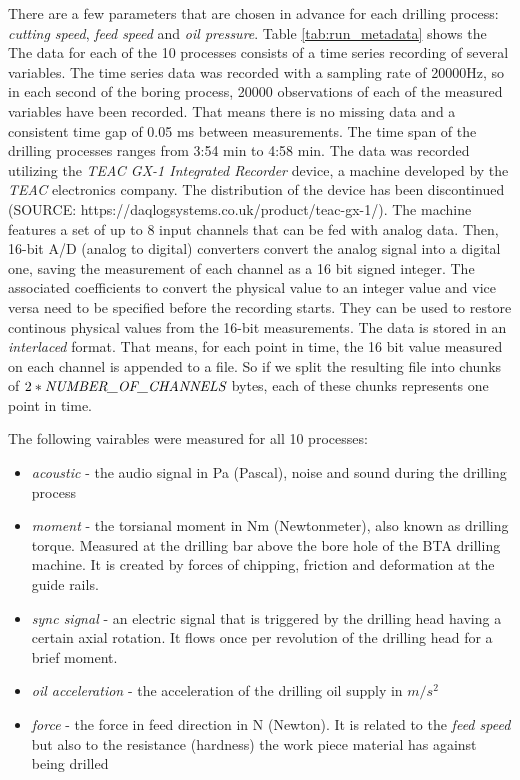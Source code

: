\documentclass[12 pt]{scrartcl}
\begin{document}
There are a few parameters that are chosen in advance for each drilling process: \emph{cutting speed}, \emph{feed speed} and \emph{oil pressure}. Table \ref{tab:run_metadata} shows the
The data for each of the 10 processes consists of a time series recording of several variables.
The time series data was recorded with a sampling rate of 20000Hz, so in each second of the boring process, 20000 observations of each of the measured variables have been recorded. That means there is no missing data and a consistent time gap of 0.05 ms between measurements. The time span of the drilling processes ranges from 3:54 min to 4:58 min.
The data was recorded utilizing the \emph{TEAC GX-1 Integrated Recorder} device, a machine developed by the \emph{TEAC} electronics company. The distribution of the device has been discontinued (SOURCE: https://daqlogsystems.co.uk/product/teac-gx-1/). The machine features a set of up to 8 input channels that can be fed with analog data.
Then, 16-bit A/D (analog to digital) converters convert the analog signal into a digital one, saving the measurement of each channel as a 16 bit signed integer.
The associated coefficients to convert the physical value to an integer value and vice versa need to be specified before the recording starts. They can be used to restore continous physical values from the 16-bit measurements. The data is stored in an \emph{interlaced} format. That means, for each point in time, the 16 bit value measured on each channel is appended to a file. So if we split the resulting file into chunks of $2*\emph{NUMBER\_OF\_CHANNELS}$ bytes, each of these chunks represents one point in time.

The following vairables were measured for all 10 processes:
\begin{itemize}
  \item \emph{acoustic} - the audio signal in Pa (Pascal), noise and sound during the drilling process
  \item \emph{moment} - the torsianal moment in Nm (Newtonmeter), also known as drilling torque. Measured at the drilling bar above the bore hole of the BTA drilling machine. It is created by forces of chipping, friction and deformation at the guide rails.
  \item \emph{sync signal} - an electric signal that is triggered by the drilling head having a certain axial rotation. It flows once per revolution of the drilling head for a brief moment.
  \item \emph{oil acceleration} - the acceleration of the drilling oil supply in $m/s^2$
  \item \emph{force} - the force in feed direction in N (Newton). It is related to the \emph{feed speed} but also to the resistance (hardness) the work piece material has against being drilled
\end{itemize}
\end{document}
